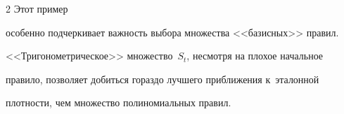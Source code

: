 \begin{multicols}{2}
Этот пример 


особенно подчеркивает важ\-ность выбора множества <<базисных>> правил. 


<<Тригонометрическое>> множество~$S_t$, несмотря на плохое начальное 


правило, позволяет добиться гораздо лучшего при\-бли\-же\-ния к~эталонной 


плот\-ности, чем множество полиномиальных правил.








   


\end{multicols}








\setcounter{table}{4}


